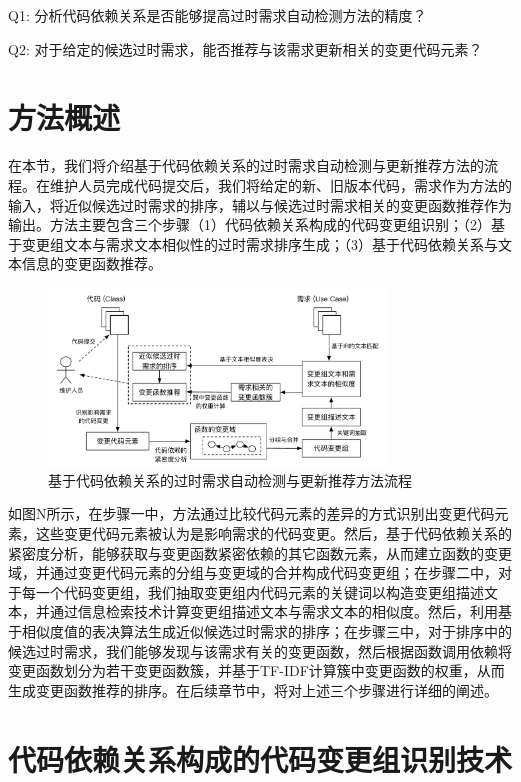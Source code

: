 Q1: 分析代码依赖关系是否能够提高过时需求自动检测方法的精度？

Q2: 对于给定的候选过时需求，能否推荐与该需求更新相关的变更代码元素？

\section{方法概述}

在本节，我们将介绍基于代码依赖关系的过时需求自动检测与更新推荐方法的流程。在维护人员完成代码提交后，我们将给定的新、旧版本代码，需求作为方法的输入，将近似候选过时需求的排序，辅以与候选过时需求相关的变更函数推荐作为输出。方法主要包含三个步骤（1）代码依赖关系构成的代码变更组识别；（2）基于变更组文本与需求文本相似性的过时需求排序生成；（3）基于代码依赖关系与文本信息的变更函数推荐。

\begin{figure}[thb]
    \centering
    \includegraphics[width=0.8\textwidth]{./figures/approach/approach_overview.pdf}
    \caption{基于代码依赖关系的过时需求自动检测与更新推荐方法流程}
    \label{F:ApproachOverview}
\end{figure}

如图N所示，在步骤一中，方法通过比较代码元素的差异的方式识别出变更代码元素，这些变更代码元素被认为是影响需求的代码变更。然后，基于代码依赖关系的紧密度分析，能够获取与变更函数紧密依赖的其它函数元素，从而建立函数的变更域，并通过变更代码元素的分组与变更域的合并构成代码变更组；在步骤二中，对于每一个代码变更组，我们抽取变更组内代码元素的关键词以构造变更组描述文本，并通过信息检索技术计算变更组描述文本与需求文本的相似度。然后，利用基于相似度值的表决算法生成近似候选过时需求的排序；在步骤三中，对于排序中的候选过时需求，我们能够发现与该需求有关的变更函数，然后根据函数调用依赖将变更函数划分为若干变更函数簇，并基于TF-IDF计算簇中变更函数的权重，从而生成变更函数推荐的排序。在后续章节中，将对上述三个步骤进行详细的阐述。

\section{代码依赖关系构成的代码变更组识别技术}
